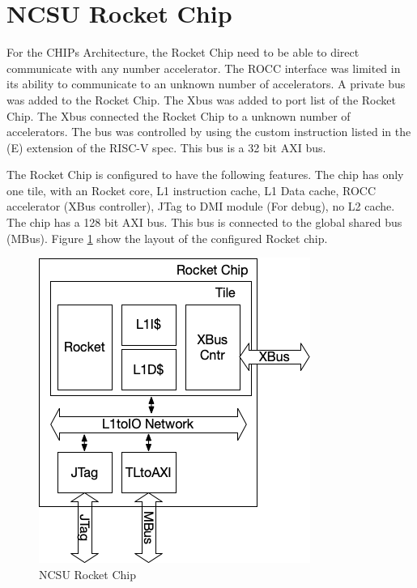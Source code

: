 \documentclass[../main.tex]{subfiles}
\begin{document}
\section{NCSU Rocket Chip}
For the CHIPs Architecture, the Rocket Chip need to be able to direct communicate with any number accelerator. The ROCC interface was limited in its ability to communicate to an unknown number of accelerators. A private bus was added to the Rocket Chip. The Xbus was added to port list of the Rocket Chip. The Xbus connected the Rocket Chip to a unknown number of accelerators. The bus was controlled by using the custom instruction listed in the (E) extension of the RISC-V spec. This bus is a 32 bit AXI bus.

The Rocket Chip is configured to have the following features. The chip has only one tile, with an Rocket core, L1 instruction cache, L1 Data cache, ROCC accelerator (XBus controller), JTag to DMI module (For debug), no L2 cache. The chip has a 128 bit AXI bus. This bus is connected to the global shared bus (MBus). Figure \ref{fig:RocketChip} show the layout of the configured Rocket chip.
\begin{figure}
    \centering
    \includegraphics[scale=.5]{pngs/RocketChip.png}
    \caption{NCSU Rocket Chip}
    \label{fig:RocketChip}
\end{figure}
\end{document}
